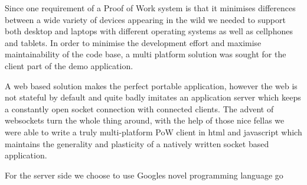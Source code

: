 Since one requirement of a Proof of Work system is that it minimises differences between a wide variety of devices appearing in the wild we needed to support both desktop and laptops with different operating systems as well as cellphones and tablets.
In order to minimise the development effort and maximise maintainability of the code base, a multi platform solution was sought for the client part of the demo application. 

A web based solution makes the perfect portable application, however the web is not stateful by default and quite badly imitates an application server which keeps a constantly open socket connection with connected clients. The advent of websockets turn the whole thing around, with the help of those nice fellas we were able to write a truly multi-platform PoW client in html and javascript which maintains the generality and plasticity of a natively written socket based application. 

For the server side we choose to use Googles novel programming language go